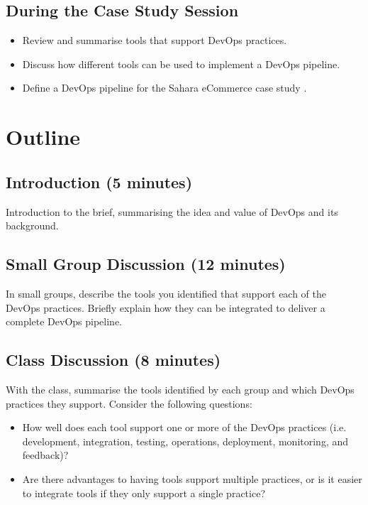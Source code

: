 \documentclass{csse4400}
\begin{document}
\subsection*{During the Case Study Session}
\begin{itemize}
    \item Review and summarise tools that support DevOps practices.
    \item Discuss how different tools can be used to implement a DevOps pipeline.
    \item Define a DevOps pipeline for the Sahara eCommerce case study \cite{service-based-slides}.
\end{itemize}


\section{Outline}

\subsection*{Introduction (5 minutes)}
Introduction to the brief, summarising the idea and value of DevOps and its background.


\subsection*{Small Group Discussion (12 minutes)}
In small groups, describe the tools you identified that support each of the DevOps practices.
Briefly explain how they can be integrated to deliver a complete DevOps pipeline.


\subsection*{Class Discussion (8 minutes)}
With the class, summarise the tools identified by each group and which DevOps practices they support.
Consider the following questions:
\begin{itemize}
    \item How well does each tool support one or more of the DevOps practices
          (i.e. development, integration, testing, operations, deployment, monitoring, and feedback)?
    \item Are there advantages to having tools support multiple practices,
          or is it easier to integrate tools if they only support a single practice?
\end{itemize}
\end{document}
